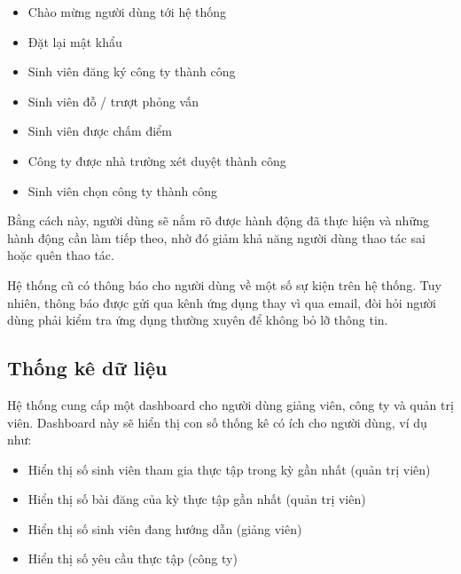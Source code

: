 \documentclass[./../main.tex]{subfiles}
\begin{document}
\begin{itemize}
\item
  
  Chào mừng người dùng tới hệ thống
  
\item
  
  Đặt lại mật khẩu
  
\item
  
  Sinh viên đăng ký công ty thành công
  
\item
  
  Sinh viên đỗ / trượt phỏng vấn
  
\item
  
  Sinh viên được chấm điểm
  
\item
  
  Công ty được nhà trường xét duyệt thành công
  
\item
  
  Sinh viên chọn công ty thành công
  
\end{itemize}

Bằng cách này, người dùng sẽ nắm rõ được hành động đã thực hiện và những
hành động cần làm tiếp theo, nhờ đó giảm khả năng người dùng thao tác
sai hoặc quên thao tác.

Hệ thống cũ có thông báo cho người dùng về một số sự kiện trên hệ thống.
Tuy nhiên, thông báo được gửi qua kênh ứng dụng thay vì qua email, đòi
hỏi người dùng phải kiểm tra ứng dụng thường xuyên để không bỏ lỡ thông
tin.

\hypertarget{thux1ed1ng-kuxea-dux1eef-liux1ec7u}{%
\subsection{Thống kê dữ
liệu}\label{thux1ed1ng-kuxea-dux1eef-liux1ec7u}}

Hệ thống cung cấp một dashboard cho người dùng giảng viên, công ty và
quản trị viên. Dashboard này sẽ hiển thị con số thống kê có ích cho
người dùng, ví dụ như:

\begin{itemize}
\item
  
  Hiển thị số sinh viên tham gia thực tập trong kỳ gần nhất (quản trị
  viên)
  
\item
  
  Hiển thị số bài đăng của kỳ thực tập gần nhất (quản trị viên)
  
\item
  
  Hiển thị số sinh viên đang hướng dẫn (giảng viên)
  
\item
  
  Hiển thị số yêu cầu thực tập (công ty)
  
\end{itemize}
\end{document}

